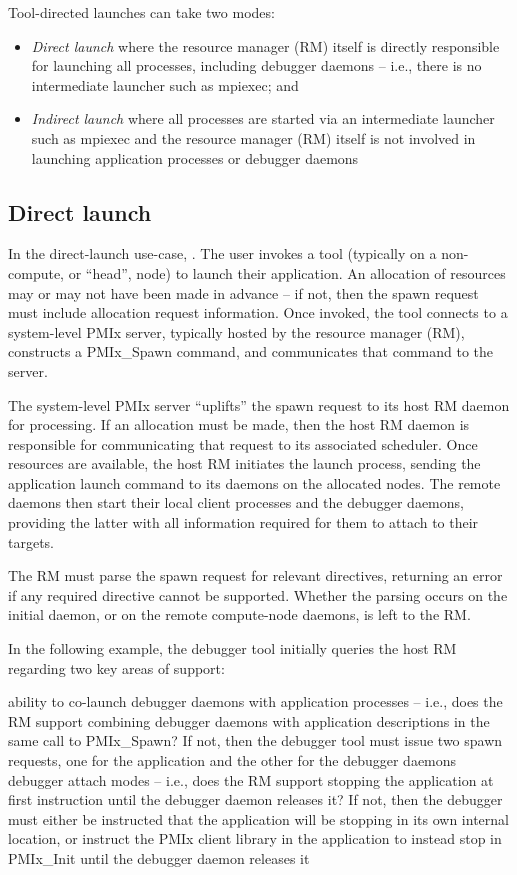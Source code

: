 Tool-directed launches can take two modes:

\begin{itemize}
    \item \emph{Direct launch} where the resource manager (RM) itself is directly responsible for launching all processes, including debugger daemons – i.e., there is no intermediate launcher such as mpiexec; and
    \item \emph{Indirect launch} where all processes are started via an intermediate launcher such as mpiexec and the resource manager (RM) itself is not involved in launching application processes or debugger daemons
\end{itemize}


\subsection{Direct launch}

In the direct-launch use-case, . The user invokes a tool (typically on a non-compute, or “head”, node) to launch their application. An allocation of resources may or may not have been made in advance – if not, then the spawn request must include allocation request information. Once invoked, the tool connects to a system-level PMIx server, typically hosted by the resource manager (RM), constructs a PMIx_Spawn command, and communicates that command to the server.

The system-level PMIx server “uplifts” the spawn request to its host RM daemon for processing. If an allocation must be made, then the host RM daemon is responsible for communicating that request to its associated scheduler. Once resources are available, the host RM initiates the launch process, sending the application launch command to its daemons on the allocated nodes. The remote daemons then start their local client processes and the debugger daemons, providing the latter with all information required for them to attach to their targets.

The RM must parse the spawn request for relevant directives, returning an error if any required directive cannot be supported. Whether the parsing occurs on the initial daemon, or on the remote compute-node daemons, is left to the RM.

In the following example, the debugger tool initially queries the host RM regarding two key areas of support:

    ability to co-launch debugger daemons with application processes – i.e., does the RM support combining debugger daemons with application descriptions in the same call to PMIx_Spawn? If not, then the debugger tool must issue two spawn requests, one for the application and the other for the debugger daemons
    debugger attach modes – i.e., does the RM support stopping the application at first instruction until the debugger daemon releases it? If not, then the debugger must either be instructed that the application will be stopping in its own internal location, or instruct the PMIx client library in the application to instead stop in PMIx_Init until the debugger daemon releases it

